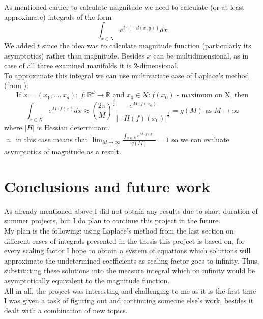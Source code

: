 \documentclass{article}
\begin{document}
As mentioned earlier to calculate magnitude we need to calculate (or at least approximate)
integrals of the form
$$\int_{x \in X} e^{t \cdot (-d(x, y))} dx$$
We added $t$ since the idea was to calculate magnitude function (particularly its
asymptotics) rather than magnitude. Besides $x$ can be multidimensional, as in
case of all three examined manifolds it is 2-dimensional.
\\

To approximate this integral we can use multivariate case of Laplace's method (from \textcite{fedor}):
$$\text{If } x = (x_1, ..., x_d); \ f: \mathbb{R}^d \rightarrow \mathbb{R} \text{ and } x_0 \in X : f(x_0) \text{ - maximum on X, then}$$
$$\int_{x \in X} e^{M \cdot f(x)} dx \approx \left( \frac{2\pi}{M} \right)^{\frac{d}{2}} \frac{e^{M \cdot f(x_0)}}{|-H(f)(x_0)|^{\frac{1}{2}}} = g(M) \text{ as } M \rightarrow \infty $$
where $|H|$ is Hessian determinant.
\\

$\approx $ in this case means that $\lim_{M\to\infty} \frac{\int_{x \in X} e^{M \cdot f(x)}}{g(M)} = 1$ so we can evaluate asymptotics of magnitude as a result. 

\section{Conclusions and future work}
As already mentioned above I did not obtain any results due to short duration of 
summer projects, but I do plan to continue this project in the future. 
\\

My plan is the following: using Laplace's method from the last section on different cases of integrals presented
in the thesis this project is based on, for every scaling factor I hope to obtain 
a system of equations which solutions will approximate the undetermined coefficients
as scaling factor goes to infinity. Thus, substituting these solutions into the measure
integral which on infinity would be asymptotically equivalent to the magnitude function.
\\

All in all, the project was interesting and challenging to me as it is the first time I was 
given a task of figuring out and continuing someone else's work, besides it dealt with a combination of
new topics.
\printbibliography
\end{document}
